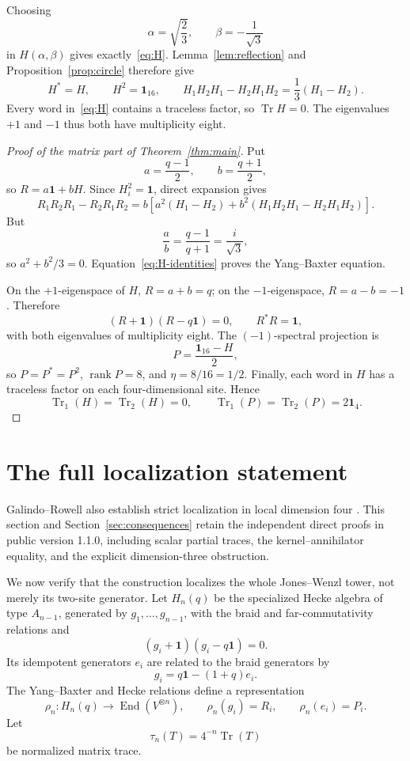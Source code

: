 \documentclass[11pt]{article}
\theoremstyle{remark}
\newcommand{\Id}{\mathbf 1}
\newcommand{\Tr}{\operatorname{Tr}}
\newcommand{\End}{\operatorname{End}}
\newcommand{\rank}{\operatorname{rank}}
\begin{document}
Choosing
\[
  \alpha=\sqrt{\frac23},\qquad\beta=-\frac1{\sqrt3}
\]
in \(H(\alpha,\beta)\) gives exactly~\eqref{eq:H}.  Lemma~\ref{lem:reflection}
and Proposition~\ref{prop:circle} therefore give
\begin{equation}
  H^*=H,\qquad H^2=\Id_{16},\qquad
  H_1H_2H_1-H_2H_1H_2=\frac13(H_1-H_2).
  \label{eq:H-identities}
\end{equation}
Every word in~\eqref{eq:H} contains a traceless factor, so
\(\Tr H=0\).  The eigenvalues \(+1\) and \(-1\) thus both have multiplicity
eight.

\begin{proof}[Proof of the matrix part of Theorem~\ref{thm:main}]
Put
\[
  a=\frac{q-1}{2},\qquad b=\frac{q+1}{2},
\]
so \(R=a\Id+bH\).  Since \(H_i^2=\Id\), direct expansion gives
\[
  R_1R_2R_1-R_2R_1R_2
  =
  b\left[
    a^2(H_1-H_2)+b^2(H_1H_2H_1-H_2H_1H_2)
  \right].
\]
But
\[
  \frac ab=\frac{q-1}{q+1}=\frac{i}{\sqrt3},
\]
so \(a^2+b^2/3=0\).  Equation~\eqref{eq:H-identities} proves
the Yang--Baxter equation.

On the \(+1\)-eigenspace of \(H\), \(R=a+b=q\); on the
\(-1\)-eigenspace, \(R=a-b=-1\).  Therefore
\[
  (R+\Id)(R-q\Id)=0,\qquad R^*R=\Id,
\]
with both eigenvalues of multiplicity eight.  The \((-1)\)-spectral
projection is
\[
  P=\frac{\Id_{16}-H}{2},
\]
so \(P=P^*=P^2\), \(\rank P=8\), and \(\eta=8/16=1/2\).
Finally, each word in \(H\) has a traceless factor on each four-dimensional
site.  Hence
\[
  \Tr_1(H)=\Tr_2(H)=0,\qquad
  \Tr_1(P)=\Tr_2(P)=2\Id_4.
\]
\end{proof}

\section{The full localization statement}\label{sec:localization}

Galindo--Rowell also establish strict localization in local dimension four
\cite[\S13]{GalindoRowell2026}.
This section and Section~\ref{sec:consequences} retain the independent direct
proofs in public version 1.1.0, including scalar partial traces, the
kernel--annihilator equality, and the explicit dimension-three obstruction.

We now verify that the construction localizes the whole Jones--Wenzl tower,
not merely its two-site generator.  Let \(H_n(q)\) be the specialized Hecke
algebra of type \(A_{n-1}\), generated by \(g_1,\ldots,g_{n-1}\), with the braid and
far-commutativity relations and
\[
  (g_i+\Id)(g_i-q\Id)=0.
\]
Its idempotent generators \(e_i\) are related to the braid generators by
\[
  g_i=q\Id-(1+q)e_i.
\]
The Yang--Baxter and Hecke relations define a representation
\[
  \rho_n:H_n(q)\longrightarrow\End(V^{\otimes n}),\qquad
  \rho_n(g_i)=R_i,\qquad \rho_n(e_i)=P_i.
\]
Let
\[
  \tau_n(T)=4^{-n}\Tr(T)
\]
be normalized matrix trace.
\end{document}
